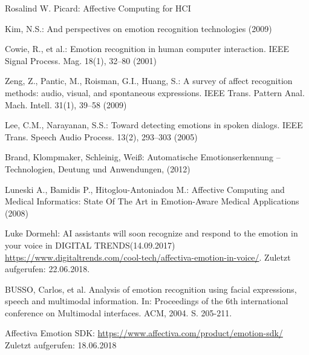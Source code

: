 \documentclass[journal]{IEEEtran}
\begin{document}
	\begin{thebibliography}{1}
		Rosalind W. Picard: Affective Computing for HCI 
		
		Kim, N.S.: And perspectives on emotion recognition technologies (2009)
		
		Cowie, R., et al.: Emotion recognition in human computer interaction. IEEE Signal Process.
		Mag. 18(1), 32–80 (2001)
		
		Zeng, Z., Pantic, M., Roisman, G.I., Huang, S.: A survey of affect recognition methods: audio,
		visual, and spontaneous expressions. IEEE Trans. Pattern Anal. Mach. Intell. 31(1), 39–58
		(2009)
		
		Lee, C.M., Narayanan, S.S.: Toward detecting emotions in spoken dialogs. IEEE Trans. Speech
		Audio Process. 13(2), 293–303 (2005)
		
		
		Brand, Klompmaker, Schleinig, Weiß: Automatische Emotionserkennung – Technologien, Deutung und Anwendungen, (2012)
		
		Luneski A., Bamidis P., Hitoglou-Antoniadou M.: Affective Computing and Medical Informatics: State Of The Art in Emotion-Aware Medical Applications (2008)
		
		Luke Dormehl: AI assistants will soon recognize and respond to the emotion in your voice in DIGITAL TRENDS(14.09.2017) 
		\url{https://www.digitaltrends.com/cool-tech/affectiva-emotion-in-voice/}. Zuletzt aufgerufen: 22.06.2018.
		
		
		BUSSO, Carlos, et al. Analysis of emotion recognition using facial expressions, speech and multimodal information. In: Proceedings of the 6th international conference on Multimodal interfaces. ACM, 2004. S. 205-211.
		
		Affectiva Emotion SDK:
		\url{https://www.affectiva.com/product/emotion-sdk/} Zuletzt aufgerufen: 18.06.2018
		

\end{thebibliography}
\end{document}
